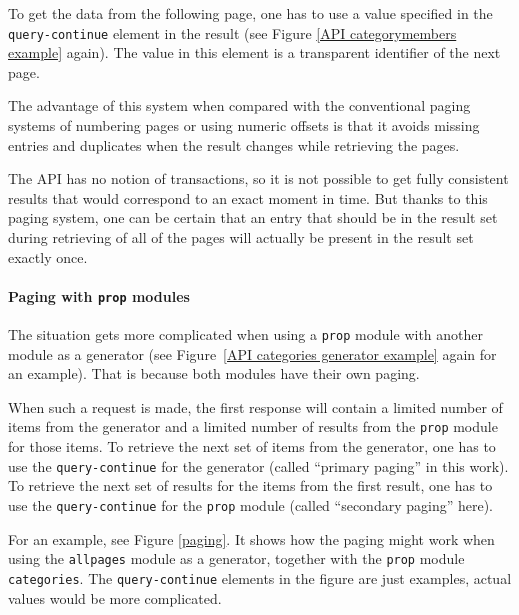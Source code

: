 To get the data from the following page, one has to use a value specified in the \texttt{query-continue}
element in the result (see Figure \ref{API categorymembers example} again).
The value in this element is a transparent identifier of the next page.

The advantage of this system when compared with the conventional paging systems of numbering pages
or using numeric offsets is that it avoids missing entries and duplicates when the result
changes while retrieving the pages.

The \ac{API} has no notion of transactions, so it is not possible to get fully consistent results
that would correspond to an exact moment in time.
But thanks to this paging system, one can be certain that an entry that should be in the result set
during retrieving of all of the pages will actually be present in the result set exactly once.

\paragraph{Paging with \texttt{prop} modules}

The situation gets more complicated when using a \texttt{prop} module with another module as a generator
(see Figure~\ref{API categories generator example} again for an example).
That is because both modules have their own paging.

When such a request is made, the first response will contain a limited number of items from the generator
and a limited number of results from the \texttt{prop} module for those items.
To retrieve the next set of items from the generator, one has to use the \texttt{query-continue} for the generator
(called “primary paging” in this work).
To retrieve the next set of results for the items from the first result,
one has to use the \texttt{query-continue} for the \texttt{prop} module (called “secondary paging” here).

For an example, see Figure \ref{paging}.
It shows how the paging might work when using the \texttt{allpages} module as a generator,
together with the \texttt{prop} module \texttt{categories}.
The \texttt{query-continue} elements in the figure are just examples,
actual values would be more complicated.

